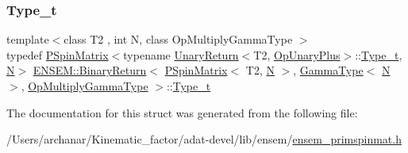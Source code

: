 \subsubsection{\texorpdfstring{Type\_t}{Type\_t}\hspace{0.1cm}{\footnotesize\ttfamily [3/3]}}
{\footnotesize\ttfamily template$<$class T2 , int N, class Op\+Multiply\+Gamma\+Type $>$ \\
typedef \mbox{\hyperlink{classENSEM_1_1PSpinMatrix}{P\+Spin\+Matrix}}$<$typename \mbox{\hyperlink{structENSEM_1_1UnaryReturn}{Unary\+Return}}$<$T2, \mbox{\hyperlink{structENSEM_1_1OpUnaryPlus}{Op\+Unary\+Plus}}$>$\+::\mbox{\hyperlink{structENSEM_1_1BinaryReturn_3_01PSpinMatrix_3_01T2_00_01N_01_4_00_01GammaType_3_01N_01_4_00_01OpMultiplyGammaType_01_4_aec0b80e85e8c340e1defc22cf233cb7f}{Type\+\_\+t}}, \mbox{\hyperlink{adat__devel_2lib_2hadron_2operator__name__util_8cc_a7722c8ecbb62d99aee7ce68b1752f337}{N}}$>$ \mbox{\hyperlink{structENSEM_1_1BinaryReturn}{E\+N\+S\+E\+M\+::\+Binary\+Return}}$<$ \mbox{\hyperlink{classENSEM_1_1PSpinMatrix}{P\+Spin\+Matrix}}$<$ T2, \mbox{\hyperlink{adat__devel_2lib_2hadron_2operator__name__util_8cc_a7722c8ecbb62d99aee7ce68b1752f337}{N}} $>$, \mbox{\hyperlink{classENSEM_1_1GammaType}{Gamma\+Type}}$<$ \mbox{\hyperlink{adat__devel_2lib_2hadron_2operator__name__util_8cc_a7722c8ecbb62d99aee7ce68b1752f337}{N}} $>$, \mbox{\hyperlink{structENSEM_1_1OpMultiplyGammaType}{Op\+Multiply\+Gamma\+Type}} $>$\+::\mbox{\hyperlink{structENSEM_1_1BinaryReturn_3_01PSpinMatrix_3_01T2_00_01N_01_4_00_01GammaType_3_01N_01_4_00_01OpMultiplyGammaType_01_4_aec0b80e85e8c340e1defc22cf233cb7f}{Type\+\_\+t}}}



The documentation for this struct was generated from the following file\+:\begin{DoxyCompactItemize}
\item 
/\+Users/archanar/\+Kinematic\+\_\+factor/adat-\/devel/lib/ensem/\mbox{\hyperlink{adat-devel_2lib_2ensem_2ensem__primspinmat_8h}{ensem\+\_\+primspinmat.\+h}}\end{DoxyCompactItemize}
